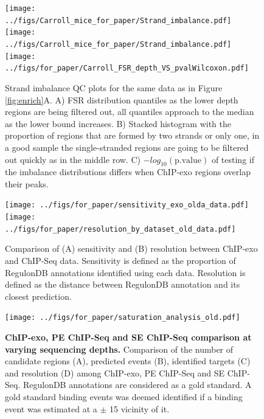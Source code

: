 \documentclass{bmcart}\usepackage[]{graphicx}\usepackage[]{color}
\begin{document}
\newpage

\begin{figure}[h!]
  \centering  
  \texttt{[image: ../figs/Carroll\_mice\_for\_paper/Strand\_imbalance.pdf]} 
  \newline
  \texttt{[image: ../figs/Carroll\_mice\_for\_paper/Strand\_imbalance.pdf]} 
  \texttt{[image: ../figs/for\_paper/Carroll\_FSR\_depth\_VS\_pvalWilcoxon.pdf]}
  \caption{Strand imbalance QC plots for the same data as in Figure
    \ref{fig:enrich}A. A) FSR distribution quantiles as the lower
    depth regions are being filtered out, all quantiles approach to
    the median as the lower bound increases. B) Stacked histogram with
    the proportion of regions that are formed by two strands or only
    one, in a good sample the single-stranded regions are going to be
    filtered out quickly as in the middle row. C)
    $-log_{10}(\text{p.value})$ of testing if the imbalance
    distributions differs when ChIP-exo regions overlap their peaks.}
  \label{fig:strand}
\end{figure}

\newpage

\begin{figure}[h!]
  \centering
  \texttt{[image: ../figs/for\_paper/sensitivity\_exo\_olda\_data.pdf]}
  \texttt{[image: ../figs/for\_paper/resolution\_by\_dataset\_old\_data.pdf]}
   \caption{Comparison of (A) sensitivity and (B) resolution between
     ChIP-exo and ChIP-Seq data. Sensitivity is defined as the
     proportion of RegulonDB annotations identified using each
     data. Resolution is defined as the distance between RegulonDB
     annotation and its closest prediction.}
  \label{fig:reso_all}
\end{figure}

\newpage

\begin{figure}[h]
  \centering
  \texttt{[image: ../figs/for\_paper/saturation\_analysis\_old.pdf]}
  \caption{\textbf{ChIP-exo, PE ChIP-Seq and SE ChIP-Seq comparison at
      varying sequencing depths.} Comparison of the number of candidate
    regions (A), predicted events (B), identified targets (C) and
    resolution (D) among ChIP-exo, PE ChIP-Seq and SE
    ChIP-Seq. RegulonDB annotations are considered as a gold
    standard. A gold standard binding events was deemed identified if
    a binding event was estimated at a $\pm$ 15 vicinity of
    it.}
  \label{fig:design}
\end{figure}

\newpage
\end{document}

